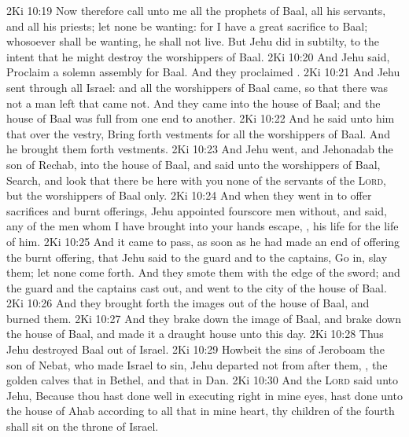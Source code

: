 \vs 2Ki 10:19 Now therefore call unto me all the prophets of Baal, all his servants, and all his priests; let none be wanting: for I have a great sacrifice  to Baal; whosoever shall be wanting, he shall not live. But Jehu did  in subtilty, to the intent that he might destroy the worshippers of Baal.
\vs 2Ki 10:20 And Jehu said, Proclaim a solemn assembly for Baal. And they proclaimed .
\vs 2Ki 10:21 And Jehu sent through all Israel: and all the worshippers of Baal came, so that there was not a man left that came not. And they came into the house of Baal; and the house of Baal was full from one end to another.
\vs 2Ki 10:22 And he said unto him that  over the vestry, Bring forth vestments for all the worshippers of Baal. And he brought them forth vestments.
\vs 2Ki 10:23 And Jehu went, and Jehonadab the son of Rechab, into the house of Baal, and said unto the worshippers of Baal, Search, and look that there be here with you none of the servants of the \textsc{Lord}, but the worshippers of Baal only.
\vs 2Ki 10:24 And when they went in to offer sacrifices and burnt offerings, Jehu appointed fourscore men without, and said,  any of the men whom I have brought into your hands escape, , his life  for the life of him.
\vs 2Ki 10:25 And it came to pass, as soon as he had made an end of offering the burnt offering, that Jehu said to the guard and to the captains, Go in,  slay them; let none come forth. And they smote them with the edge of the sword; and the guard and the captains cast  out, and went to the city of the house of Baal.
\vs 2Ki 10:26 And they brought forth the images out of the house of Baal, and burned them.
\vs 2Ki 10:27 And they brake down the image of Baal, and brake down the house of Baal, and made it a draught house unto this day.
\vs 2Ki 10:28 Thus Jehu destroyed Baal out of Israel.
\vs 2Ki 10:29 Howbeit  the sins of Jeroboam the son of Nebat, who made Israel to sin, Jehu departed not from after them, , the golden calves that  in Bethel, and that  in Dan.
\vs 2Ki 10:30 And the \textsc{Lord} said unto Jehu, Because thou hast done well in executing  right in mine eyes,  hast done unto the house of Ahab according to all that  in mine heart, thy children of the fourth  shall sit on the throne of Israel.
